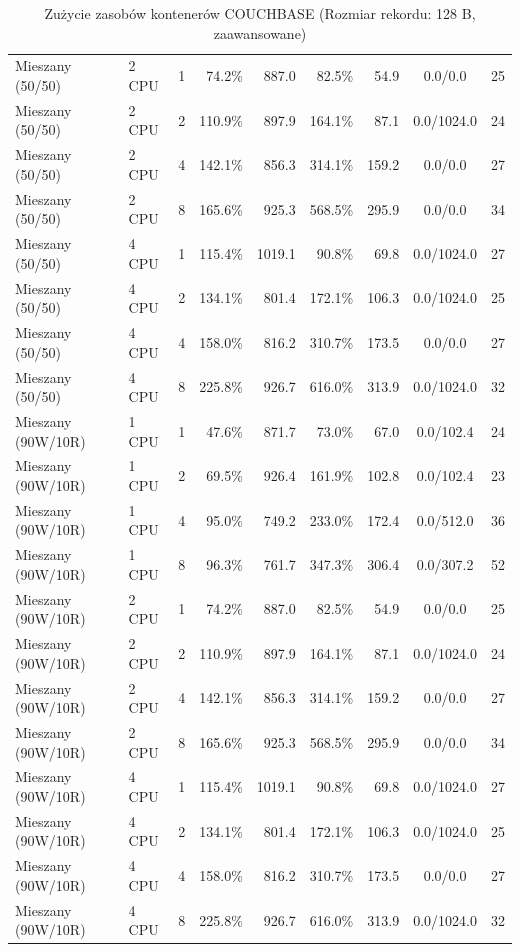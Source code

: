\begin{table}[ht]
{\begin{tabular}{llcrrrrcc}
Mieszany (50/50) & 2 CPU & 1 & 74.2\% & 887.0 & 82.5\% & 54.9 & 0.0/0.0 & 25 \\
Mieszany (50/50) & 2 CPU & 2 & 110.9\% & 897.9 & 164.1\% & 87.1 & 0.0/1024.0 & 24 \\
Mieszany (50/50) & 2 CPU & 4 & 142.1\% & 856.3 & 314.1\% & 159.2 & 0.0/0.0 & 27 \\
Mieszany (50/50) & 2 CPU & 8 & 165.6\% & 925.3 & 568.5\% & 295.9 & 0.0/0.0 & 34 \\
Mieszany (50/50) & 4 CPU & 1 & 115.4\% & 1019.1 & 90.8\% & 69.8 & 0.0/1024.0 & 27 \\
Mieszany (50/50) & 4 CPU & 2 & 134.1\% & 801.4 & 172.1\% & 106.3 & 0.0/1024.0 & 25 \\
Mieszany (50/50) & 4 CPU & 4 & 158.0\% & 816.2 & 310.7\% & 173.5 & 0.0/0.0 & 27 \\
Mieszany (50/50) & 4 CPU & 8 & 225.8\% & 926.7 & 616.0\% & 313.9 & 0.0/1024.0 & 32 \\
Mieszany (90W/10R) & 1 CPU & 1 & 47.6\% & 871.7 & 73.0\% & 67.0 & 0.0/102.4 & 24 \\
Mieszany (90W/10R) & 1 CPU & 2 & 69.5\% & 926.4 & 161.9\% & 102.8 & 0.0/102.4 & 23 \\
Mieszany (90W/10R) & 1 CPU & 4 & 95.0\% & 749.2 & 233.0\% & 172.4 & 0.0/512.0 & 36 \\
Mieszany (90W/10R) & 1 CPU & 8 & 96.3\% & 761.7 & 347.3\% & 306.4 & 0.0/307.2 & 52 \\
Mieszany (90W/10R) & 2 CPU & 1 & 74.2\% & 887.0 & 82.5\% & 54.9 & 0.0/0.0 & 25 \\
Mieszany (90W/10R) & 2 CPU & 2 & 110.9\% & 897.9 & 164.1\% & 87.1 & 0.0/1024.0 & 24 \\
Mieszany (90W/10R) & 2 CPU & 4 & 142.1\% & 856.3 & 314.1\% & 159.2 & 0.0/0.0 & 27 \\
Mieszany (90W/10R) & 2 CPU & 8 & 165.6\% & 925.3 & 568.5\% & 295.9 & 0.0/0.0 & 34 \\
Mieszany (90W/10R) & 4 CPU & 1 & 115.4\% & 1019.1 & 90.8\% & 69.8 & 0.0/1024.0 & 27 \\
Mieszany (90W/10R) & 4 CPU & 2 & 134.1\% & 801.4 & 172.1\% & 106.3 & 0.0/1024.0 & 25 \\
Mieszany (90W/10R) & 4 CPU & 4 & 158.0\% & 816.2 & 310.7\% & 173.5 & 0.0/0.0 & 27 \\
Mieszany (90W/10R) & 4 CPU & 8 & 225.8\% & 926.7 & 616.0\% & 313.9 & 0.0/1024.0 & 32 \\
\bottomrule
\end{tabular}%
}
\caption{Zużycie zasobów kontenerów COUCHBASE (Rozmiar rekordu: 128 B, zaawansowane)}
\label{tab:resources_couchbase_small_0}
\end{table}
